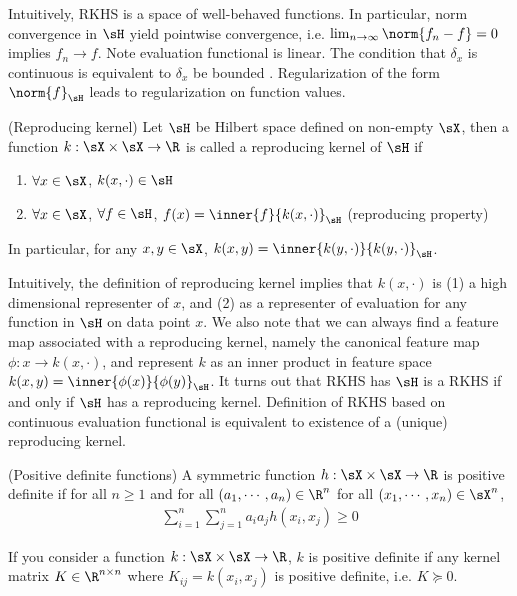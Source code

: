 \documentclass[11pt]{article}
\begin{document}
Intuitively, RKHS is a space of well-behaved functions. In particular, norm convergence in $\sH$ yield pointwise convergence, i.e. $\lim_{n\to\infty}\norm{f_n-f} = 0$ implies $f_n \to f$. Note evaluation functional is linear. The condition that $\delta_x$ is continuous is equivalent to $\delta_x$ be bounded \cite{grettonWhatRKHS2012}. Regularization of the form $\norm{f}_{\sH}$ leads to regularization on function values.

\begin{definition}
    (Reproducing kernel) Let $\sH$ be Hilbert space defined on non-empty $\sX$, then a function $k:\sX\times\sX\to\R$ is called a reproducing kernel of $\sH$ if
    \begin{enumerate}
        \item $\forall x\in\sX$, $k(x,\cdot)\in\sH$ 
        \item $\forall x\in\sX$, $\forall f\in\sH$, $f(x) = \inner{f}{k(x,\cdot)}_{\sH}$ (reproducing property)
    \end{enumerate}
    In particular, for any $x,y\in\sX$, $k(x,y) = \inner{k(y,\cdot)}{k(y,\cdot)}_{\sH}$.
\end{definition}

Intuitively, the definition of reproducing kernel implies that $k(x,\cdot)$ is (1) a high dimensional representer of $x$, and (2) as a representer of evaluation for any function in $\sH$ on data point $x$. We also note that we can always find a feature map associated with a reproducing kernel, namely the canonical feature map $\phi:x\to k(x,\cdot)$, and represent $k$ as an inner product in feature space $k(x,y) = \inner{\phi(x)}{\phi(y)}_{\sH}$. It turns out that RKHS has $\sH$ is a RKHS if and only if $\sH$ has a reproducing kernel. Definition of RKHS based on continuous evaluation functional is equivalent to existence of a (unique) reproducing kernel. 

\begin{definition}
    (Positive definite functions) A symmetric function $h:\sX\times\sX\to\R$ is positive definite if for all $n\geq 1$ and for all $(a_1,\cdots,a_n)\in\R^n$ for all $(x_1,\cdots,x_n)\in\sX^n$, 
    \begin{align}
        \sum_{i=1}^n \sum_{j=1}^n a_i a_j h(x_i,x_j) \geq 0
    \end{align}
\end{definition}
If you consider a function $k:\sX\times\sX\to\R$, $k$ is positive definite if any kernel matrix $K\in\R^{n\times n}$ where $K_{ij}=k(x_i,x_j)$ is positive definite, i.e. $K\succeq 0$. 
\end{document}
